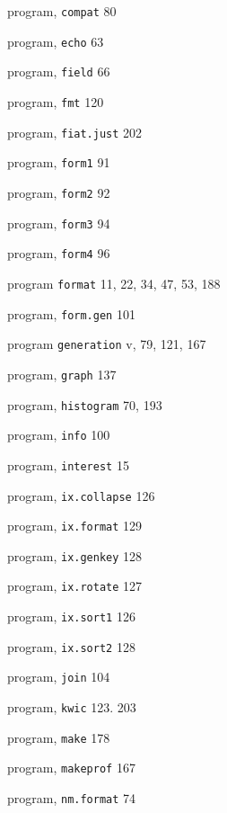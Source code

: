 \begin{multicols}{3}
\hangindent=3pc  program, \verb'compat' 80

\hangindent=3pc  program, \verb'echo' 63

\hangindent=3pc  program, \verb'field' 66

\hangindent=3pc  program, \verb'fmt' 120

\hangindent=3pc  program, \verb'fiat.just' 202

\hangindent=3pc  program, \verb'form1' 91

\hangindent=3pc  program, \verb'form2' 92

\hangindent=3pc  program, \verb'form3' 94

\hangindent=3pc  program, \verb'form4' 96

\hangindent=3pc  program \verb'format' 11, 22, 34, 47, 53, 188

\hangindent=3pc  program, \verb'form.gen' 101

\hangindent=3pc  program \verb'generation' v, 79, 121, 167

\hangindent=3pc  program, \verb'graph' 137

\hangindent=3pc  program, \verb'histogram' 70, 193

\hangindent=3pc  program, \verb'info' 100

\hangindent=3pc  program, \verb'interest' 15

\hangindent=3pc  program, \verb'ix.collapse' 126

\hangindent=3pc  program, \verb'ix.format' 129

\hangindent=3pc  program, \verb'ix.genkey' 128

\hangindent=3pc  program, \verb'ix.rotate' 127

\hangindent=3pc  program, \verb'ix.sort1' 126

\hangindent=3pc  program, \verb'ix.sort2' 128

\hangindent=3pc  program, \verb'join' 104

\hangindent=3pc  program, \verb'kwic' 123. 203

\hangindent=3pc  program, \verb'make' 178

\hangindent=3pc  program, \verb'makeprof' 167

\hangindent=3pc  program, \verb'nm.format' 74


\end{multicols}
